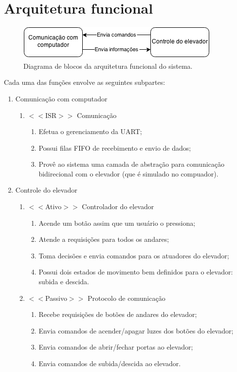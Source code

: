 \chapter{Arquitetura funcional}


\begin{figure}[h]
    \centering
    \includegraphics[width=0.8\columnwidth]{./figures/arq_funcional.png}
    \caption{Diagrama de blocos da arquitetura funcional do sistema.}
    \label{fig:arq_funcional}
\end{figure}


Cada uma das funções envolve as seguintes subpartes:

\begin{enumerate}
	\item Comunicação com computador
	\begin{enumerate}
		\item $<<$ISR$>>$ Comunicação
		\begin{enumerate}
			\item Efetua o gerenciamento da UART;
			\item Possui filas FIFO de recebimento e envio de dados;
			\item Provê ao sistema uma camada de abstração para comunicação bidirecional com o elevador (que é simulado no compuador).
		\end{enumerate}
	\end{enumerate}
	
	\item Controle do elevador
	\begin{enumerate}
		\item $<<$Ativo$>>$ Controlador do elevador
		\begin{enumerate}
			\item Acende um botão assim que um usuário o pressiona;
			\item Atende a requisições para todos os andares;
			\item Toma decisões e envia comandos para os atuadores do elevador;
			\item Possui dois estados de movimento bem definidos para o elevador: subida e descida.
		\end{enumerate}
		\item $<<$Passivo$>>$ Protocolo de comunicação
		\begin{enumerate}
			\item Recebe requisições de botões de andares do elevador;
			\item Envia comandos de acender/apagar luzes dos botões do elevador;
			\item Envia comandos de abrir/fechar portas ao elevador;
			\item Envia comandos de subida/descida ao elevador.
		\end{enumerate}
	\end{enumerate}
\end{enumerate}


